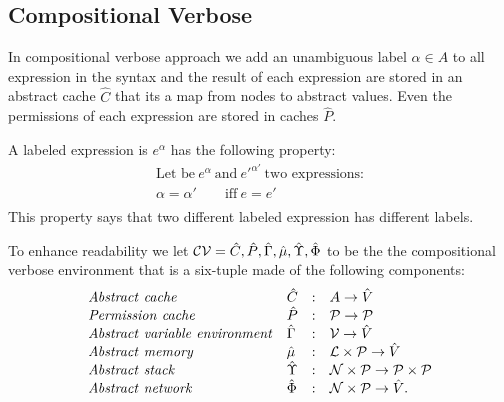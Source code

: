 \newcommand{\all}[0]{\alpha}

\newcommand{\absCV}{\mathcal{CV}}
\newcommand{\cenvs}{\absCV}
\newcommand{\Cat}[0]{\absCV_{\hat{C}}}
\newcommand{\muat}[0]{\absCV_{\hat{\mu}}}
\newcommand{\Env}[0]{\absCV_{\hat{\Gamma}}}
\newcommand{\Pat}[0]{\absCV_{\hat{P}}}
\newcommand{\Phiat}[0]{\absCV_{\hat{\Phi}}}
\newcommand{\Upsat}[0]{\absCV_{\hat{\Upsilon}}}
\newcommand{\ccest}[1]{\cenvs \Vdash_{cv, \rho_s} #1}
\newcommand{\ccestl}[1]{\cenvs \Vdash_{cv, \rho_s} {(#1)}^{\alpha}}
\newcommand{\lbt}[1]{{e_#1}^{\alpha_#1}}

\subsection{Compositional Verbose}
In compositional verbose approach we add an unambiguous label $\all \in A$ to all expression in the syntax and the result of each expression are stored in an abstract cache $\hat{C}$ that its a map from nodes to abstract values. Even the permissions of each expression are stored in caches $\hat{P}$.

A labeled expression is $e^\all$ has the following property:
\begin{align*}
\text{Let be}\ e^\all \ \text{and}\ e'^{\all'} \ \text{two expressions:}\\
\all = \all' \qquad\text{iff}\ e = e'\\
\end{align*}
This property says that two different labeled expression has different labels.

To enhance readability we let $\absCV = \hat{C}, \hat{P}, \hat{\Gamma}, \hat{\mu},  \abstack, \absnet$ to be the the compositional verbose environment that is a six-tuple made of the following components:
\[
\begin{array}{llcl}
\mathit{Abstract\ cache} & \hat{C} & : & A \rightarrow \hat{V} \\
\mathit{Permission\ cache} & \hat{P} & : & \mathcal{P} \rightarrow \mathcal{P} \\
\mathit{Abstract\ variable\ environment} & \hat{\Gamma} & : & \mathcal{V} \rightarrow \hat{V} \\
\mathit{Abstract\ memory} & \hat{\mu} & : & {\mathcal L} \times \mathcal{P} \rightarrow \hat{V} \\
\mathit{Abstract\ stack} & \hat{\Upsilon} & : & \mathcal{N} \times \mathcal{P} \rightarrow \mathcal{P} \times \mathcal{P} \\
\mathit{Abstract\ network} & \hat{\Phi} & : & \mathcal{N} \times \mathcal{P} \rightarrow \hat{V}.
\end{array}
\]


